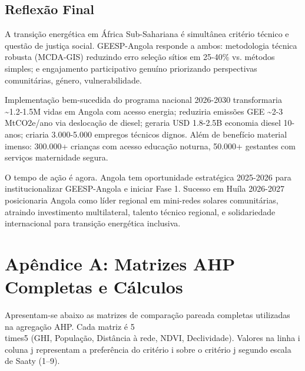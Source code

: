 \documentclass[12pt, a4paper]{article}
\begin{document}
\subsection{Reflexão Final}

A transição energética em África Sub-Sahariana é simultânea critério técnico e questão de justiça social. GEESP-Angola responde a ambos: metodologia técnica robusta (MCDA-GIS) reduzindo erro seleção sítios em 25-40\% vs. métodos simples; e engajamento participativo genuíno priorizando perspectivas comunitárias, género, vulnerabilidade.

Implementação bem-sucedida do programa nacional 2026-2030 transformaria \textasciitilde{}1.2-1.5M vidas em Angola com acesso energia; reduziria emissões GEE \textasciitilde{}2-3 MtCO2e/ano via deslocação de diesel; geraria USD 1.8-2.5B economia diesel 10-anos; criaria 3.000-5.000 empregos técnicos dignos. Além de benefício material imenso: 300.000+ crianças com acesso educação noturna, 50.000+ gestantes com serviços maternidade segura.

O tempo de ação é agora. Angola tem oportunidade estratégica 2025-2026 para institucionalizar GEESP-Angola e iniciar Fase 1. Sucesso em Huíla 2026-2027 posicionaria Angola como líder regional em mini-redes solares comunitárias, atraindo investimento multilateral, talento técnico regional, e solidariedade internacional para transição energética inclusiva.

\clearpage
\section*{Apêndice A: Matrizes AHP Completas e Cálculos}

Apresentam-se abaixo as matrizes de comparação pareada completas utilizadas na agregação AHP. Cada matriz é 5\\times5 (GHI, População, Distância à rede, NDVI, Declividade). Valores na linha i coluna j representam a preferência do critério i sobre o critério j segundo escala de Saaty (1--9).

\begin{table}[H]
\centering
\caption{Matriz Pareada Agregada (Exemplo Numérico)}
\small
{}
\end{table}
\end{document}
